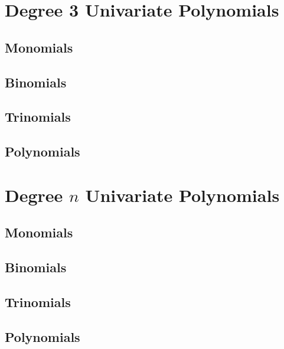 \documentclass[20150903-160354-rs2.2-MarksMathNotebook.tex]{subfiles}
\begin{document}
\section{Degree 3 Univariate Polynomials}

\subsection*{Monomials}

\subsection*{Binomials}

\subsection*{Trinomials}

\subsection*{Polynomials}

\section{Degree $n$ Univariate Polynomials}

\subsection*{Monomials}



\subsection*{Binomials}

\subsection*{Trinomials}

\subsection*{Polynomials}
\end{document}
